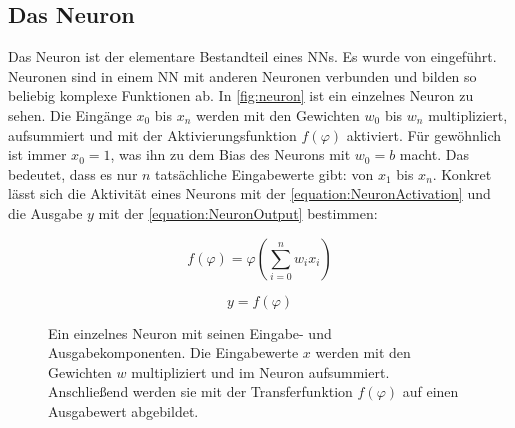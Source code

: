 \subsection{Das Neuron}
\label{chap:neuron}

Das Neuron ist der elementare Bestandteil eines \acp{NN}. Es wurde \citeyear{McCulloch1943} von \citeauthor{McCulloch1943} \cite{McCulloch1943} eingeführt. Neuronen sind in einem \ac{NN} mit anderen Neuronen verbunden und bilden so beliebig komplexe Funktionen ab. In \autoref{fig:neuron} ist ein einzelnes Neuron zu sehen. Die Eingänge $x_{0}$ bis $x_{n}$ werden mit den Gewichten $w_{0}$ bis $w_{n}$ multipliziert, aufsummiert und mit der Aktivierungsfunktion $f(\varphi)$ aktiviert. Für gewöhnlich ist immer $x_{0}=1$, was ihn zu dem Bias des Neurons mit $w_{0}=b$ macht. Das bedeutet, dass es nur $n$ tatsächliche Eingabewerte gibt: von $x_{1}$ bis $x_{n}$. Konkret lässt sich die Aktivität eines Neurons mit der \autoref{equation:NeuronActivation} und die Ausgabe $y$ mit der \autoref{equation:NeuronOutput} bestimmen:

\begin{equation}
  f(\varphi) = \varphi(\sum_{i=0}^{n}w_{i}x_{i})
  \label{equation:NeuronActivation}
\end{equation}

\begin{equation}
  y = f(\varphi)
  \label{equation:NeuronOutput}
\end{equation}

\begin{figure}
  \centering
  \caption{Ein einzelnes Neuron mit seinen Eingabe- und Ausgabekomponenten. Die Eingabewerte $x$ werden mit den Gewichten $w$ multipliziert und im Neuron aufsummiert. Anschließend werden sie mit der Transferfunktion $f(\varphi)$ auf einen Ausgabewert abgebildet.}
  \label{fig:neuron}
\end{figure}

